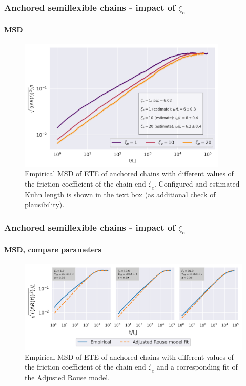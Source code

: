 \documentclass[handout]{beamer}
\begin{document}
\begin{frame}
    \frametitle{Anchored semiflexible chains - impact of $\zeta_e$}
    \framesubtitle{MSD}
    \begin{figure}[h]
        \includegraphics[width=10cm]{./14+15+16-exp-msd-log.png}
        \caption{Empirical MSD of ETE of anchored chains with different values of the friction
        coefficient of the chain end $\zeta_e$. Configured and estimated Kuhn length is shown in the text
        box (as additional check of plausibility).}
    \end{figure}
\end{frame}


\begin{frame}
    \frametitle{Anchored semiflexible chains - impact of $\zeta_e$}
    \framesubtitle{MSD, compare parameters}
    \begin{figure}[h]
        \includegraphics[width=\textwidth]{14+15+16-exp-msd-log-arm_fit-log.png}
        \caption{Empirical MSD of ETE of anchored chains with different values of
        the friction coefficient of the chain end $\zeta_e$ and a corresponding fit
        of the Adjusted Rouse model.
        }
    \end{figure}
\end{frame}
\end{document}
